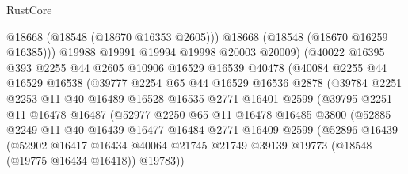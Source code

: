 \begin{lexlean}{RustCore}
\begin{coremodule}
                        @18668
                        (@18548 (@18670 @16353 @2605)))
                      @18668
                      (@18548 (@18670 @16259 @16385)))
                    @19988
                    @19991
                    @19994
                    @19998
                    @20003
                    @20009)
                  (@40022
                    @16395
                    @393
                    @2255
                    @44
                    @2605
                    @10906
                    @16529
                    @16539
                    @40478
                    (@40084
                      @2255
                      @44
                      @16529
                      @16538
                      (@39777
                        @2254
                        @65
                        @44
                        @16529
                        @16536
                        @2878
                        (@39784
                          @2251
                          @2253
                          @11
                          @40
                          @16489
                          @16528
                          @16535
                          @2771
                          @16401
                          @2599
                          (@39795
                            @2251
                            @11
                            @16478
                            @16487
                            (@52977
                              @2250
                              @65
                              @11
                              @16478
                              @16485
                              @3800
                              (@52885
                                @2249
                                @11
                                @40
                                @16439
                                @16477
                                @16484
                                @2771
                                @16409
                                @2599
                                (@52896
                                  @16439
                                  (@52902
                                    @16417
                                    @16434
                                    @40064
                                    @21745
                                    @21749
                                    @39139
                                    @19773
                                    (@18548 (@19775 @16434 @16418))
                                    @19783))

\end{coremodule}
\end{lexlean}
